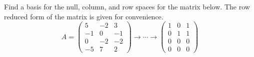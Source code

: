 \begin{problem}
    Find a basis for the null, column, and row spaces for the matrix below.  The row
    reduced form of the matrix is given for convenience.
    \[ A = \begin{pmatrix} 5 & -2 & 3 \\ -1 & 0 & -1 \\ 0 & -2 & -2 \\ -5 & 7 & 2
    \end{pmatrix} \to \cdots \to \begin{pmatrix}
            1 & 0 & 1 \\ 0 & 1 & 1 \\ 0 & 0 & 0 \\ 0 & 0 & 0 
        \end{pmatrix} \]
\end{problem}


